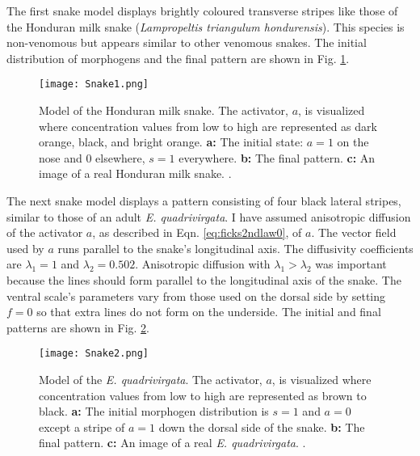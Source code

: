\newpage
The first snake model displays brightly coloured transverse stripes like those of the Honduran milk snake (\textit{Lampropeltis triangulum hondurensis}). This species is non-venomous but appears similar to other venomous snakes. The initial distribution of morphogens and the final pattern are shown in Fig. \ref{fig:Snake1}.

\begin{figure}[ht]
	\centering
	\texttt{[image: Snake1.png]}
	\caption[Model of the Honduran milk snake]{Model of the Honduran milk snake. The activator, $a$, is visualized where concentration values from low to high are represented as dark orange, black, and bright orange. \textbf{a:} The initial state: $a=1$ on the nose and $0$ elsewhere, $s=1$ everywhere. \textbf{b:} The final pattern. \textbf{c:} An image of a real Honduran milk snake. .}
	\label{fig:Snake1}
\end{figure}

The next snake model displays a pattern consisting of four black lateral stripes, similar to those of an adult \textit{E. quadrivirgata}. I have assumed anisotropic diffusion of the activator $a$, as described in Eqn. \ref{eq:ficks2ndlaw0}, of $a$. The vector field used by $a$ runs parallel to the snake's longitudinal axis. The diffusivity coefficients are $\lambda_{1}=1$ and $\lambda_{2}=0.502$. Anisotropic diffusion with $\lambda_{1} > \lambda_{2}$ was important because the lines should form parallel to the longitudinal axis of the snake. The ventral scale's parameters vary from those used on the dorsal side by setting $f=0$ so that extra lines do not form on the underside. The initial and final patterns are shown in Fig. \ref{fig:Snake2}.

\begin{figure}[ht]
	\centering
	\texttt{[image: Snake2.png]}
	\caption[Model of the \textit{E. quadrivirgata}]{Model of the \textit{E. quadrivirgata}. The activator, $a$, is visualized where concentration values from low to high are represented as brown to black. \textbf{a:} The initial morphogen distribution is $s=1$ and $a=0$ except a stripe of $a=1$ down the dorsal side of the snake. \textbf{b:} The final pattern. \textbf{c:} An image of a real \textit{E. quadrivirgata}. .}
	\label{fig:Snake2}
\end{figure}

